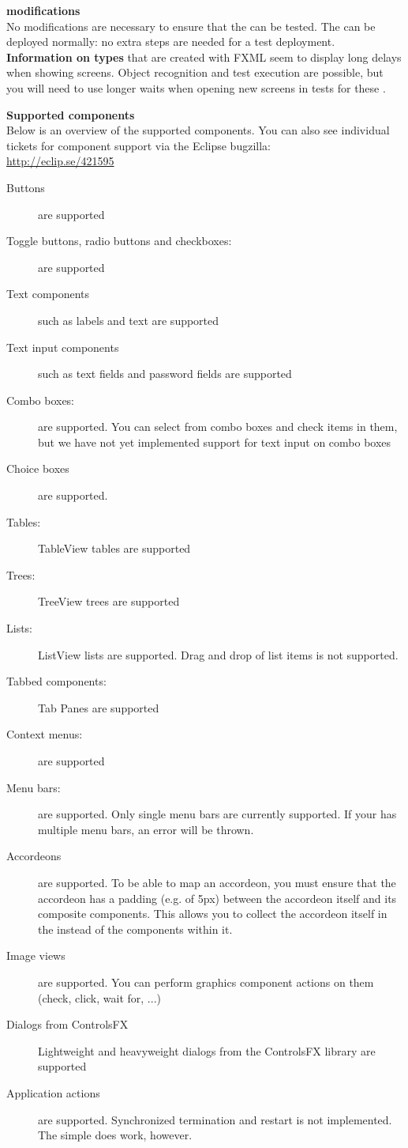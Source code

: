 \textbf{\gdaut{} modifications}\\
No modifications are necessary to ensure that the \gdaut{} can be tested. The \gdaut{} can be deployed normally: no extra steps are needed for a test deployment.
\textbf{Information on \gdaut{} types}
\gdauts{} that are created with FXML seem to display long delays when showing screens. Object recognition and test execution are possible, but you will need to use longer waits when opening new screens in tests for these \gdauts{}.

\textbf{Supported components}\\
Below is an overview of the supported components. You can also see individual tickets for component support via the Eclipse bugzilla:\\
\url{http://eclip.se/421595}
\begin{description}
\item [Buttons]{are supported}
\item [Toggle buttons, radio buttons and checkboxes:]{are supported}
\item [Text components]{such as labels and text are supported}
\item [Text input components]{such as text fields and password fields are supported}
\item [Combo boxes:]{are supported. You can select from combo boxes and check items in them, but we have not yet implemented support for text input on combo boxes}
\item [Choice boxes]{are supported.}
\item [Tables:]{TableView tables are supported}
\item [Trees:]{TreeView trees are supported}
\item [Lists:]{ListView lists are supported. Drag and drop of list items is not supported. }
\item [Tabbed components:]{Tab Panes are supported}
\item [Context menus:]{are supported}
\item [Menu bars:]{are supported. Only single menu bars are currently supported. If your \gdaut{} has multiple menu bars, an error will be thrown.}
\item [Accordeons]{are supported. To be able to map an accordeon, you must ensure that the accordeon has a padding (e.g. of 5px) between the accordeon itself and its composite components. This allows you to collect the accordeon itself in the \gdomm{} instead of the components within it.}
\item [Image views]{are supported. You can perform graphics component actions on them (check, click, wait for, ...)}
\item [Dialogs from ControlsFX]{Lightweight and heavyweight dialogs from the ControlsFX library are supported}
\item [Application actions]{are supported. Synchronized termination and restart is not implemented. The simple  does work, however.}
\end{description}

